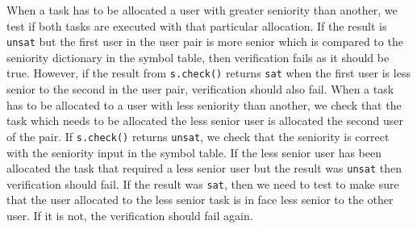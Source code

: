 \documentclass[a4paper]{report}
\begin{document}
When a task has to be allocated a user with greater seniority than another, we test if both tasks are executed with that particular allocation. If the result is \texttt{unsat} but the first user in the user pair is more senior which is compared to the seniority dictionary in the symbol table, then verification fails as it should be true. However, if the result from \texttt{s.check()} returns \texttt{sat} when the first user is less senior to the second in the user pair, verification should also fail. When a task has to be allocated to a user with less seniority than another, we check that the task which needs to be allocated the less senior user is allocated the second user of the pair. If \texttt{s.check()} returns \texttt{unsat}, we check that the seniority is correct with the seniority input in the symbol table. If the less senior user has been allocated the task that required a less senior user but the result was \texttt{unsat} then verification should fail. If the result was \texttt{sat}, then we need to test to make sure that the user allocated to the less senior task is in face less senior to the other user. If it is not, the verification should fail again.\\
\end{document}
